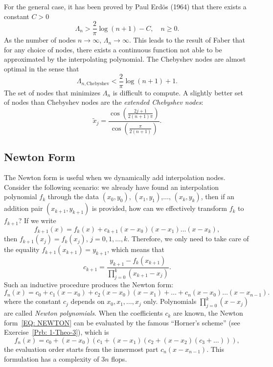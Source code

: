 For the general case, it has been proved by Paul Erd\"os (1964) that there exists a constant $C > 0$
\begin{equation}
    \Lambda_n > \frac{2}{\pi}\log(n+1) - C,\quad  n\ge 0.
\end{equation}
As the number of nodes $n\to \infty$, $\Lambda_n \to \infty$. This leads to the result of Faber that for any choice of nodes, there exists a continuous function not able to be approximated by the interpolating polynomial. The Chebyshev nodes are almost optimal in the sense that 
\begin{equation}
    \Lambda_{n, \textrm{Chebyshev}} < \frac{2}{\pi}\log(n+1) + 1.
\end{equation}
The set of nodes that minimizes $\Lambda_n$ is difficult to compute. A slightly better set of nodes than Chebyshev nodes are the \emph{ extended Chebyshev nodes}:
\begin{equation}
    \tilde{x}_j = \frac{\cos\left(\frac{2j+1}{2(n+1)\pi}\right)}{\cos\left(\frac{\pi}{2(n+1)}\right)}.
\end{equation}
\subsection{Newton Form}
\label{SSec: 2-New-For}
The Newton form is useful when we dynamically add interpolation nodes. Consider the following scenario: we already have found an interpolation polynomial $f_k$ through the data $(x_0, y_0)$, $(x_1, y_1)$,$\dots$, $(x_k, y_k)$, then if an addition pair $(x_{k+1}, y_{k+1})$ is provided, how can we effectively transform $f_k$ to $f_{k+1}$? If we write 
$$f_{k+1}(x) = f_k(x) + c_{k+1} (x - x_0)(x - x_1)\dots (x - x_{k}), $$
then $f_{k+1}(x_j) = f_k(x_j)$, $j = 0, 1,\dots, k$. Therefore, we only need to take care of the equality $f_{k+1}(x_{k+1}) = y_{k+1}$, which means that 
\begin{equation}\label{EQ: CK}
    c_{k+1} = \frac{y_{k+1} - f_k(x_{k+1})}{\prod_{j=0}^k (x_{k+1} - x_j)}.
\end{equation}
Such an inductive procedure produces the Newton form: 
\begin{equation}\label{EQ: NEWTON}
    f_n(x) = c_0 + c_1 ( x - x_0) + c_2 (x - x_0)(x - x_1)+\dots+c_{n}(x-x_0)\dots (x - x_{n-1}).
\end{equation}
where the constant $c_j$ depends on $x_0, x_1, \dots, x_{j}$ only. Polynomials $\prod_{j=0}^k (x - x_j)$ are called \emph{Newton polynomials}. When the coefficients $c_k$ are known, the Newton form~\eqref{EQ: NEWTON} can be evaluated by the famous ``Horner's scheme'' (see Exercise~\ref{Prb: 1-Theo-3}), which is
\begin{equation}\label{EQ: HORNER}
    f_n(x) = c_0 + (x-x_0)(c_1 + (x-x_1)(c_2 + (x-x_2)(c_3 + \dots))),
\end{equation}
the evaluation order starts from the innermost part $c_n (x -x_{n-1})$. This formulation has a complexity of $3n$ flops. 

